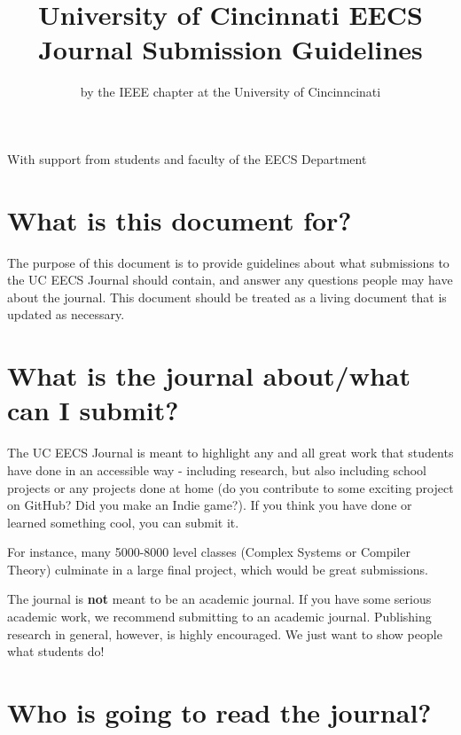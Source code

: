 \documentclass[12pt]{article}
\title{\textbf{University of Cincinnati EECS Journal Submission Guidelines}}
\author{by the IEEE chapter at the University of Cincinncinati \rule{0pt}{0pt}}
\date{March 2019\rule{0pt}{0pt}}
\begin{document}
\begin{titlepage}
    \maketitle
    
    \vspace{5in}
    \begin{center}
        With support from students and faculty of the EECS Department
    \end{center}
\end{titlepage}



\tableofcontents

\newpage


\section{What is this document for?}
The purpose of this document is to provide guidelines about what submissions to the UC EECS Journal should contain, and answer any questions people may have about the journal. This document should be treated as a living document that is updated as necessary. 

\section{What is the journal about/what can I submit?}
The UC EECS Journal is meant to highlight any and all great work that students have done in an accessible way - including research, but also including school projects or any projects done at home (do you contribute to some exciting project on GitHub? Did you make an Indie game?). If you think you have done or learned something cool, you can submit it.

For instance, many 5000-8000 level classes (Complex Systems or Compiler Theory) culminate in a large final project, which would be great submissions. 

The journal is \textbf{not} meant to be an academic journal. If you have some serious academic work, we recommend submitting to an academic journal. Publishing research in general, however, is highly encouraged. We just want to show people what students do!

\section{Who is going to read the journal?}
\end{document}
